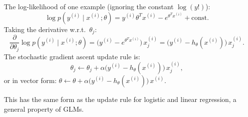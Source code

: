 \begin{answer}
The log-likelihood of one example (ignoring the constant $\log(y!)$):
\[
\log p(y^{(i)}\mid x^{(i)};\theta) = y^{(i)}\theta^T x^{(i)} - e^{\theta^T x^{(i)}} + \text{const}.
\]
Taking the derivative w.r.t.\ $\theta_j$:
\[
\frac{\partial}{\partial\theta_j}\log p(y^{(i)}\mid x^{(i)};\theta)
= \bigl(y^{(i)} - e^{\theta^T x^{(i)}}\bigr)\,x_j^{(i)}
= \bigl(y^{(i)} - h_\theta(x^{(i)})\bigr)\,x_j^{(i)}.
\]
The stochastic gradient ascent update rule is:
\[
\theta_j \leftarrow \theta_j + \alpha\bigl(y^{(i)} - h_\theta(x^{(i)})\bigr)\,x_j^{(i)},
\]
or in vector form: $\theta \leftarrow \theta + \alpha\bigl(y^{(i)} - h_\theta(x^{(i)})\bigr)\,x^{(i)}$.

This has the same form as the update rule for logistic and linear regression, a general property of GLMs.
\end{answer}
